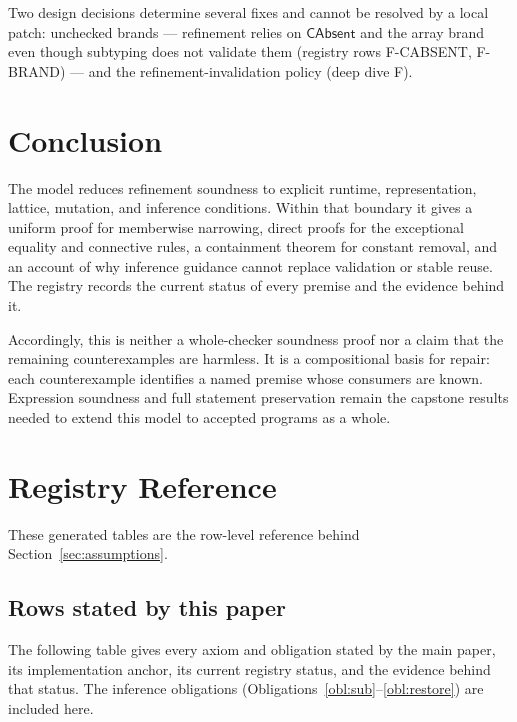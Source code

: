 \documentclass[11pt]{article}
\begin{document}
Two design decisions determine several fixes and cannot be resolved by a
local patch:
unchecked brands — refinement relies on $\mathsf{CAbsent}$ and the array brand even
though subtyping does not validate them (registry rows
F-CABSENT, F-BRAND) — and the refinement-invalidation
policy (deep dive F).

\section{Conclusion}

The model reduces refinement soundness to explicit runtime, representation,
lattice, mutation, and inference conditions. Within that boundary it gives a
uniform proof for memberwise narrowing, direct proofs for the exceptional
equality and connective rules, a containment theorem for constant removal,
and an account of why inference guidance cannot replace validation or stable
reuse. The registry records the current status of every premise and the
evidence behind it.

Accordingly, this is neither a whole-checker soundness proof nor a claim that
the remaining counterexamples are harmless. It is a compositional basis for
repair: each counterexample identifies a named premise whose consumers are
known. Expression soundness and full statement preservation remain the
capstone results needed to extend this model to accepted programs as a whole.

\appendix

\section{Registry Reference}
\label{app:registry}

These generated tables are the row-level reference behind
Section~\ref{sec:assumptions}.

\subsection{Rows stated by this paper}

The following table gives every axiom and obligation stated by the main
paper, its implementation anchor, its current registry status, and the
evidence behind that status. The inference obligations
(Obligations~\ref{obl:sub}--\ref{obl:restore}) are included here.
\end{document}
